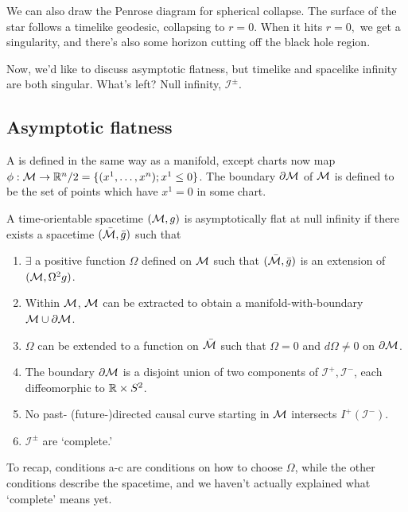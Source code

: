 We can also draw the Penrose diagram for spherical collapse. The surface of the star follows a timelike geodesic, collapsing to $r=0$. When it hits $r=0,$ we get a singularity, and there's also some horizon cutting off the black hole region.

Now, we'd like to discuss asymptotic flatness, but timelike and spacelike infinity are both singular. What's left? Null infinity, $\mathcal{I}^\pm$.

\subsection*{Asymptotic flatness}
\begin{defn}
    A  is defined in the same way as a manifold, except charts now map $\phi:\mathcal{M} \to \mathbb{R}^n/2 = \{(x^1,\ldots ,x^n); x^1 \leq 0\}$.
    The boundary $\partial \mathcal{M}$ of $\mathcal{M}$ is defined to be the set of points which have $x^1=0$ in some chart.
\end{defn}
\begin{defn}
    A time-orientable spacetime $(\mathcal{M},g)$ is asymptotically flat at null infinity if there exists a spacetime $(\bar {\mathcal{M}},\bar g)$ such that
    \begin{enumerate}
        \item $\exists$ a positive function $\Omega$ defined on $\mathcal{M}$ such that $(\bar {\mathcal{M}},\bar g)$ is an extension of $(\mathcal{M},\Omega^2 g)$.
        \item Within $\mathcal{M}$, $\mathcal{M}$ can be extracted to obtain a manifold-with-boundary $\mathcal{M} \cup \partial \mathcal{M}$.
        \item $\Omega$ can be extended to a function on $\bar {\mathcal{M}}$ such that $\Omega=0$ and $d\Omega \neq 0$ on $\partial\mathcal{M}$.
        \item The boundary $\partial \mathcal{M}$ is a disjoint union of two components of $\mathcal{I}^+, \mathcal{I}^-$, each diffeomorphic to $\mathbb{R}\times S^2$.
        \item No past- (future-)directed causal curve starting in $\mathcal{M}$ intersects $I^+(\mathcal{I}^-)$.
        \item $\mathcal{I}^\pm$ are `complete.'
    \end{enumerate}
\end{defn}
To recap, conditions a-c are conditions on how to choose $\Omega$, while the other conditions describe the spacetime, and we haven't actually explained what `complete' means yet.

